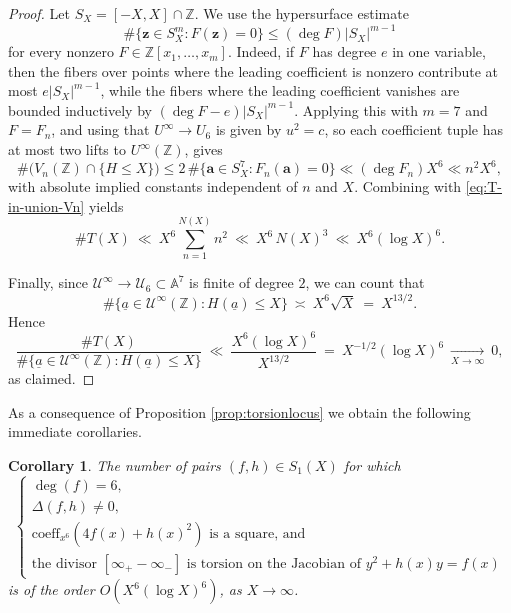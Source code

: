 \documentclass{amsart}
\newcommand{\Z}{{\mathbb Z}}
\newcommand{\cU}{\mathcal{U}}
\newcommand{\A}{\mathbb{A}}
\newcommand{\Ht}{H}
\newcommand{\ua}{\underline{a}}
\newtheorem{corollary}[proposition]{Corollary}
\begin{document}
\begin{proof}
Let \(S_X=[-X,X]\cap \mathbb Z\). We use the hypersurface estimate
\[
\#\{\mathbf z\in S_X^m:F(\mathbf z)=0\}\le (\deg F)|S_X|^{m-1}
\]
for every nonzero \(F\in \mathbb Z[x_1,\ldots,x_m]\). Indeed, if \(F\) has degree
\(e\) in one variable, then the fibers over points where the leading coefficient is
nonzero contribute at most \(e|S_X|^{m-1}\), while the fibers where the leading
coefficient vanishes are bounded inductively by
\((\deg F-e)|S_X|^{m-1}\). Applying this with \(m=7\) and \(F=F_n\), and using
that \(U^\infty\to U_6\) is given by \(u^2=c\), so each coefficient tuple has at
most two lifts to \(U^\infty(\mathbb Z)\), gives
\[
\#\bigl(V_n(\mathbb Z)\cap\{H\le X\}\bigr)
\le
2\,\#\{\mathbf a\in S_X^7:F_n(\mathbf a)=0\}
\ll (\deg F_n)X^6\ll n^2X^6,
\]
with absolute implied constants independent of \(n\) and \(X\). Combining with \eqref{eq:T-in-union-Vn} yields
\[
\#T(X)\ \ll\ X^{6}\sum_{n=1}^{N(X)} n^{2}\ \ll\ X^{6}\,N(X)^{3}\ \ll\ X^{6}(\log X)^{6}.
\]

Finally, since $\cU^{\infty}\to \cU_{6}\subset \A^{7}$ is finite of degree $2$, we can count that
\[
\#\{\ua \in \cU^{\infty}(\Z):\Ht(\ua)\le X\}\ \asymp\ X^{6}\sqrt{X}\ =\ X^{13/2}.
\]
Hence
\[
\frac{\#T(X)}{\#\{\ua \in \cU^{\infty}(\Z):\Ht(\ua)\le X\}}
\ \ll\ \frac{X^{6}(\log X)^{6}}{X^{13/2}}
\ =\ X^{-1/2}(\log X)^{6}\ \xrightarrow[X\to\infty]{}\ 0,
\]
as claimed.
\end{proof}


As a consequence of Proposition \ref{prop:torsionlocus} we obtain the following immediate corollaries.

\begin{corollary} \label{cor:s1box} The number of pairs $(f,h) \in S_1(X)$ for which $$\left\{ \begin{array}{l} \deg(f) = 6, \\ \Delta(f,h) \neq 0, \\ \mathrm{coeff}_{x^6}(4f(x)+h(x)^2) \text{ is a square, and } \\ \text{the divisor } [\infty_{+} - \infty_{-}] \text{ is torsion on the Jacobian of } y^2+h(x)y=f(x)  \end{array} \right. $$
is of the order $O(X^6(\log X)^6)$, as $X\to \infty$.
\end{corollary}
\end{document}
